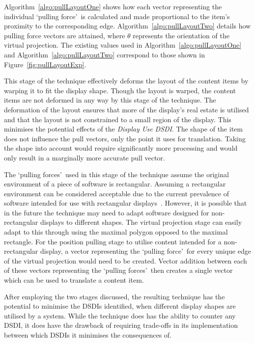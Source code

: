 \documentclass[review,5p,times,twocolumn]{elsarticle}
\begin{document}
Algorithm~\ref{algo:pullLayoutOne} shows how each vector representing the individual \lq pulling force\rq\ is calculated and made proportional to the item's proximity to the corresponding edge.
Algorithm~\ref{algo:pullLayoutTwo} details how pulling force vectors are attained, where $\theta$ represents the orientation of the virtual projection.
The existing values used in Algorithm~\ref{algo:pullLayoutOne} and Algorithm~\ref{algo:pullLayoutTwo} correspond to those shown in Figure~\ref{fig:pullLayoutExp}.

This stage of the technique effectively deforms the layout of the content items by warping it to fit the display shape.
Though the layout is warped, the content items are not deformed in any way by this stage of the technique.
The deformation of the layout ensures that more of the display's real estate is utilised and that the layout is not constrained to a small region of the display.
This minimises the potential effects of the {\emph{Display Use \ac{DSDI}}}.
The shape of the item does not influence the pull vectors, only the point it uses for translation.
Taking the shape into account would require significantly more processing and would only result in a marginally more accurate pull vector.

The \lq pulling forces\rq\ used in this stage of the technique assume the original environment of a piece of software is rectangular.
Assuming a rectangular environment can be considered acceptable due to the current prevalence of software intended for use with rectangular displays~\cite{VanDam2001}.
However, it is possible that in the future the technique may need to adapt software designed for non-rectangular displays to different shapes.
The virtual projection stage can easily adapt to this through using the maximal polygon opposed to the maximal rectangle.
For the position pulling stage to utilise content intended for a non-rectangular display, a vector representing the \lq pulling force\rq\ for every unique edge of the virtual projection would need to be created.
Vector addition between each of these vectors representing the \lq pulling forces\rq\ then creates a single vector which can be used to translate a content item.

After employing the two stages discussed, the resulting technique has the potential to minimise the \acp{DSDI} identified, when different display shapes are utilised by a system. 
While the technique does has the ability to counter any \ac{DSDI}, it does have the drawback of requiring trade-offs in its implementation between which \acp{DSDI} it minimises the consequences of.
\end{document}
